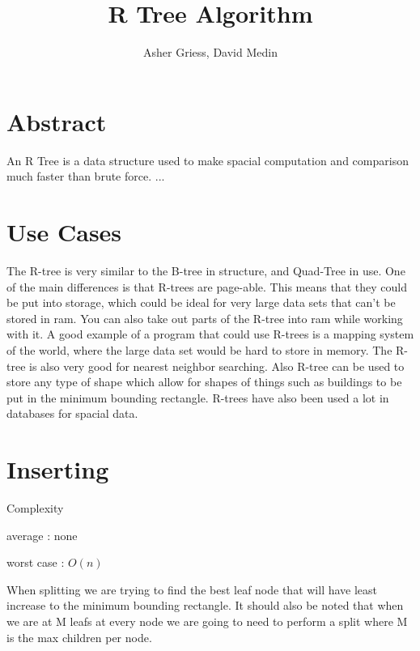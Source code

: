 \documentclass{article}
\author{Asher Griess, David Medin}
\title{R Tree Algorithm}
\begin{document}
\maketitle

\section{Abstract}
An R Tree is a data structure used to make spacial computation and comparison much faster than brute force.  ...

\section{Use Cases}
The R-tree is very similar to the B-tree in structure, and Quad-Tree in use. One of the main differences is that
R-trees are page-able. This means that they could be put into storage, which could be ideal for very large data sets
that can't be stored in ram. You can also take out parts of the R-tree into ram while working with it. A good example
of a program that could use R-trees is a mapping system of the world, where the large data set would be hard to store in memory.
The R-tree is also very good for nearest neighbor searching. Also R-tree can be used to store any type of shape which allow for shapes
of things such as buildings to be put in the minimum bounding rectangle. R-trees have also been used a lot in databases for spacial data.


\section{Inserting}
Complexity

average : none

worst case : $O(n)$

When splitting we are trying to find the best leaf node
that will have least increase to the minimum bounding rectangle.
It should also be noted that when we are at M leafs at every node we are going
to need to perform a split where M is the max children per node.
\end{document}
